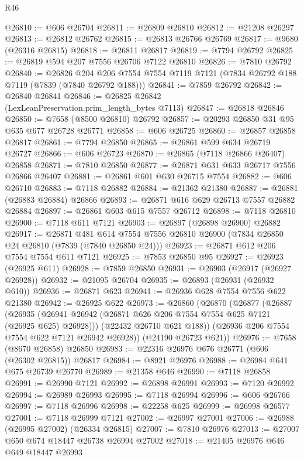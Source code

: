 \begin{lexlean}{R46}
\begin{coremodule}
@26810 := @606 @26704
@26811 := @26809 @26810
@26812 := @21208 @26297
@26813 := @26812 @26762
@26815 := @26813 @26766 @26769
@26817 := @9680 (@26316 @26815)
@26818 := @26811 @26817
@26819 := @7794 @26792
@26825 := @26819 @594 @207 @7556 @26706 @7122 @26810
@26826 := @7810 @26792
@26840 := @26826
    @204
    @206
    @7554
    @7554
    @7119
    @7121
    (@7834 @26792 @188 @7119 (@7839 (@7840 @26792 @188)))
@26841 := @7859 @26792
@26842 := @26840 @26841
@26846 := @26825 @26842 (LexLeanPreservation.prim_length_bytes @7113)
@26847 := @26818 @26846
@26850 := @7658 (@8500 @26810) @26792
@26857 := @20293 @26850 @31 @95 @635 @677 @26728 @26771
@26858 := @606 @26725
@26860 := @26857 @26858 @26817
@26861 := @7794 @26850
@26865 := @26861 @599 @634 @26719 @26727
@26866 := @606 @26723
@26870 := @26865 (@7118 @26866 @26407) @26858
@26871 := @7810 @26850
@26877 := @26871 @631 @633 @26717 @7556 @26866 @26407
@26881 := @26861 @601 @630 @26715 @7554
@26882 := @606 @26710
@26883 := @7118 @26882
@26884 := @21362 @21380
@26887 := @26881 (@26883 @26884) @26866
@26893 := @26871 @616 @629 @26713 @7557 @26882 @26884
@26897 := @26861 @603 @615 @7557 @26712
@26898 := @7118 @26810
@26900 := @7118 @611 @7121
@26903 := @26897 (@26898 @26900) @26882
@26917 := @26871
    @481
    @614
    @7554
    @7556
    @26810
    @26900
    (@7834 @26850 @24 @26810 (@7839 (@7840 @26850 @24)))
@26923 := @26871 @612 @206 @7554 @7554 @611 @7121
@26925 := @7853 @26850 @95
@26927 := @26923 (@26925 @611)
@26928 := @7859 @26850
@26931 := @26903 (@26917 (@26927 @26928))
@26932 := @21095 @26704
@26935 := @26893 (@26931 (@26932 @610))
@26936 := @26871 @623
@26941 := @26936 @628 @7554 @7556 @622 @21380
@26942 := @26925 @622
@26973 := @26860
    (@26870
      (@26877
        (@26887
          (@26935 (@26941 @26942 (@26871 @626 @206 @7554 @7554 @625 @7121 (@26925 @625) @26928)))
          (@22432 @26710 @621 @188))
        (@26936 @206 @7554 @7554 @622 @7121 @26942 @26928))
      (@24190 @26723 @621))
@26976 := @7658 (@8670 @26858) @26850
@26983 := @22316 @26976 @676 @26771 (@606 (@26302 @26815)) @26817
@26984 := @8921 @26976
@26988 := @26984 @641 @675 @26739 @26770
@26989 := @21358 @646
@26990 := @7118 @26858
@26991 := @26990 @7121
@26992 := @26898 @26991
@26993 := @7120 @26992
@26994 := @26989 @26993
@26995 := @7118 @26994
@26996 := @606 @26766
@26997 := @7118 @26996
@26998 := @22258 @625
@26999 := @26998 @26577
@27001 := @7118 @26999 @7121
@27002 := @26997 @27001
@27006 := @26988 (@26995 @27002) (@26334 @26815)
@27007 := @7810 @26976
@27013 := @27007 @650 @674 @18447 @26738 @26994 @27002
@27018 := @21405 @26976 @646 @649 @18447 @26993

\end{coremodule}
\end{lexlean}
